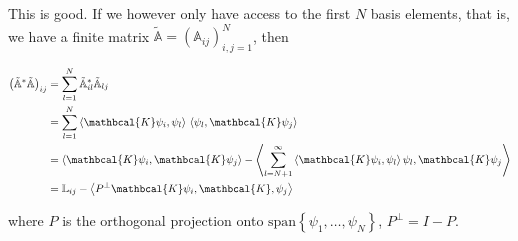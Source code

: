 \documentclass[a4paper]{article}
\newcommand{\bbA}{\mathbb{A}}
\newcommand{\bbL}{\mathbb{L}}
\newcommand{\sK}{\mathbcal{K}}
\theoremstyle{definition}
\theoremstyle{remark}
\theoremstyle{remark}
\begin{document}
This is good. If we however only have access to the first $N$ basis elements, that is, we have a finite matrix $\tilde{\bbA} = (\bbA_{i j})_{i,j = 1}^N$, then

\begin{align*}
    \left( \tilde{\bbA}^* \tilde{\bbA} \right)_{i j} 
    &= \sum_{l=1}^N \tilde{\bbA}^*_{i l} \tilde{\bbA}_{l j} \\
    &= \sum_{l=1}^N \left\langle \sK \psi_i, \psi_l \right\rangle \, \left\langle \psi_l, \sK \psi_j \right\rangle \\
    &= \left\langle \sK \psi_i, \sK \psi_j \right\rangle - \left\langle \sum_{l=N+1}^\infty \left\langle \sK \psi_i, \psi_l \right\rangle \psi_l, \sK \psi_j \right\rangle \\
    &= \bbL_{i j} - \left\langle P^\perp \sK \psi_i, \sK, \psi_j \right\rangle \\
\end{align*}

where $P$ is the orthogonal projection onto $\text{span} \left\{ \psi_1, \ldots, \psi_N \right\}$, $P^\perp = I - P$. 


\end{document}

